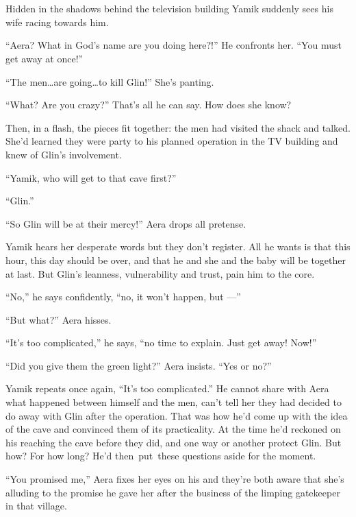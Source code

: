 \documentclass[twoside,11pt,openany]{book}
\begin{document}
\chapter{}

Hidden in the shadows behind the television building Yamik suddenly sees his wife racing towards him.

``Aera? What in God's name are you doing here?!'' He confronts her. ``You must get away at
once!''

``The men{\ldots}are going{\ldots}to kill Glin!'' She's panting.

``What?{ }Are you crazy?'' That's all he can
say.  How does she know?

Then, in a flash, the pieces fit together: the men had visited the shack and talked. She'd learned they were party to
his planned operation in the TV building and knew of Glin's involvement.

``Yamik, who will get to that cave first?''

``Glin.''

``So Glin will be at their mercy!'' Aera drops all pretense.

Yamik hears her desperate words but they don't register. All he wants is that this hour, this day should be over, and
that he and she and the baby will be together at last. But Glin's leanness, vulnerability and trust, pain him to the
core{.}

 ``No,'' he says{ }confidently,
``no, it won't happen, but ---''

``But what?'' Aera hisses.

``It's too complicated,'' he says, ``no time to explain. Just get away!
Now!''

``Did you give them the green light?'' Aera insists. ``Yes or no?''

Yamik repeats once again, ``It's too complicated.'' He
cannot{ }share with Aera what happened between himself and the men, can't tell
her they had decided to do away with Glin after the operation. That was how he'd come up with the idea of the cave and
convinced them of its practicality.  At the time he'd reckoned on his reaching the cave before they did, and one way
or another protect Glin. But how? For how long? He'd then~put~these questions aside for the moment.

``You promised me,'' Aera fixes her eyes on his and they're both aware that she's alluding to
the promise he gave her after the business of the limping gatekeeper in that village.
\end{document}
